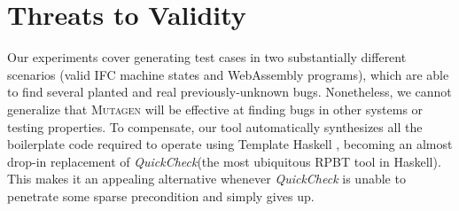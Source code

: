 \documentclass[sigconf,review,anonymous]{acmart}
\newcommand{\quickcheck}{\textit{QuickCheck}\xspace}
\newcommand{\mutagen}{\textsc{Mutagen}\xspace}
\begin{document}





\section{Threats to Validity}
\label{sec:threats}

Our experiments cover generating test cases in two substantially different
scenarios (valid IFC machine states and WebAssembly programs), which are able to
find several planted and real previously-unknown bugs. 
%
Nonetheless, we cannot generalize that \mutagen will be effective at finding
bugs in other systems or testing properties. 
%
To compensate, our tool automatically synthesizes all the boilerplate code
required to operate using Template Haskell \cite{SheardJ02}, becoming an almost
drop-in replacement of \quickcheck (the most ubiquitous RPBT tool in Haskell). 
%     
This makes it an appealing alternative whenever \quickcheck is unable to
penetrate some sparse precondition and simply gives up. 
\end{document}

